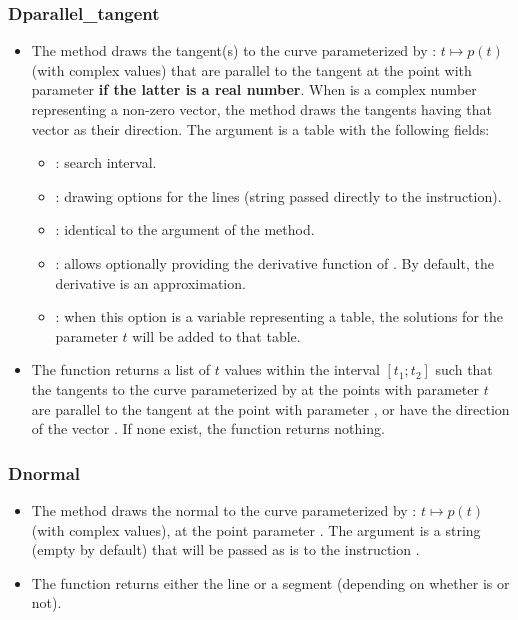 \subsubsection{Dparallel\_tangent}
\begin{itemize}
\item The method  draws the tangent(s) to the curve parameterized by : \(t \mapsto p(t)\) (with complex values) that are parallel to the tangent at the point with parameter  \textbf{if the latter is a real number}. When  is a complex number representing a non-zero vector, the method draws the tangents having that vector as their direction. The  argument is a table with the following fields:
\begin{itemize}
\item {} : search interval. 
\item {} : drawing options for the lines (string passed directly to the \drawcmd instruction). 
\item {} : identical to the  argument of the  method.
\item {} : allows optionally providing the derivative function of . By default, the derivative is an approximation. 
\item {} : when this option is a variable representing a table, the solutions for the parameter $t$ will be added to that table. 
\end{itemize}

\item The function  returns a list of $t$ values ​​within the interval $[t_1;t_2]$ such that the tangents to the curve parameterized by  at the points with parameter $t$ are parallel to the tangent at the point with parameter , or have the direction of the vector . If none exist, the function returns nothing.
\end{itemize}

\subsubsection{Dnormal}
\begin{itemize}
    \item The method  draws the normal to the curve parameterized by : \(t \mapsto p(t)\) (with complex values), at the point parameter . \arguLong{} The argument  is a string (empty by default) that will be passed as is to the instruction \drawcmd.
    \item The function  returns either the line or a segment (depending on whether  is \nil or not).
\end{itemize}

